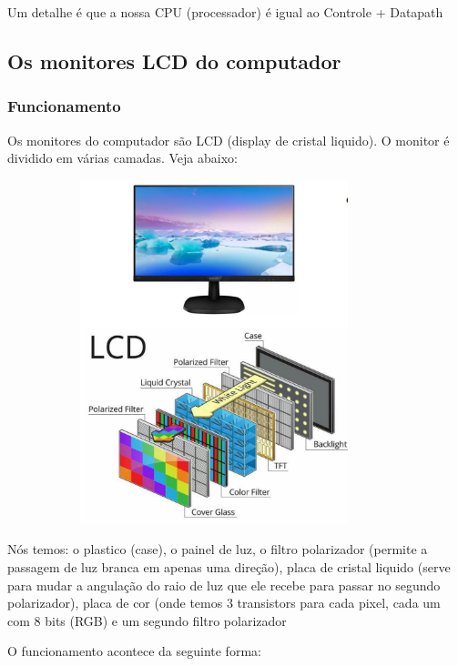\documentclass[12pt,a4paper]{report}
\begin{document}
	Um detalhe é que a nossa CPU (processador) é igual ao Controle + Datapath
	
	\subsection{Os monitores LCD do computador}
	
	\subsubsection{Funcionamento}
	
	Os monitores do computador são LCD (display de cristal liquido). O monitor é dividido em várias camadas. Veja abaixo:
	
	\begin{center}
		
		\includegraphics[width=12cm,height=10cm,keepaspectratio=false]{imagens-teoria/monitor.png}
		
	\end{center}
	
	Nós temos: o plastico (case), o painel de luz, o filtro polarizador (permite a passagem de luz branca em apenas uma direção), placa de cristal liquido (serve para mudar a angulação do raio de luz que ele recebe para passar no segundo polarizador), placa de cor (onde temos 3 transistors para cada pixel, cada um com 8 bits (RGB) e um segundo filtro polarizador
	
	O funcionamento acontece da seguinte forma: 
	
\end{document}
